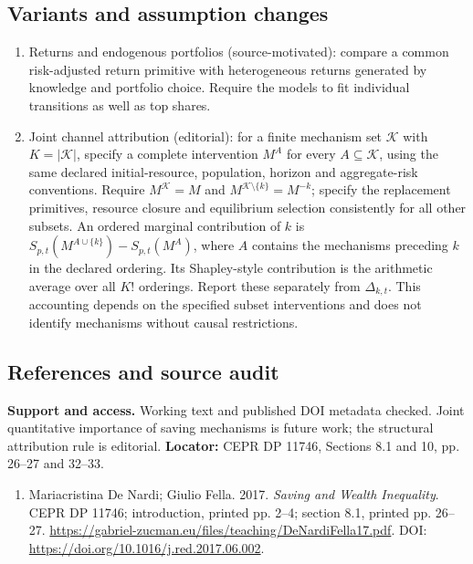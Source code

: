 \documentclass[11pt,a4paper]{article}
\begin{document}
\subsection*{Variants and assumption changes}
\begin{enumerate}
\item Returns and endogenous portfolios (source-motivated): compare a common risk-adjusted return primitive with heterogeneous returns generated by knowledge and portfolio choice. Require the models to fit individual transitions as well as top shares.
\item Joint channel attribution (editorial): for a finite mechanism set \(\mathcal K\) with \(K=|\mathcal K|\), specify a complete intervention \(M^A\) for every \(A\subseteq\mathcal K\), using the same declared initial-resource, population, horizon and aggregate-risk conventions. Require \(M^{\mathcal K}=M\) and \(M^{\mathcal K\setminus\{k\}}=M^{-k}\); specify the replacement primitives, resource closure and equilibrium selection consistently for all other subsets. An ordered marginal contribution of \(k\) is \(S_{p,t}(M^{A\cup\{k\}})-S_{p,t}(M^A)\), where \(A\) contains the mechanisms preceding \(k\) in the declared ordering. Its Shapley-style contribution is the arithmetic average over all \(K!\) orderings. Report these separately from \(\Delta_{k,t}\). This accounting depends on the specified subset interventions and does not identify mechanisms without causal restrictions.
\end{enumerate}
\subsection*{References and source audit}
\textbf{Support and access.} Working text and published DOI metadata checked. Joint quantitative importance of saving mechanisms is future work; the structural attribution rule is editorial. \textbf{Locator:} CEPR DP 11746, Sections 8.1 and 10, pp. 26--27 and 32--33.
\begin{enumerate}\raggedright
\item\hypertarget{definitions:source:30007644:1}{} Mariacristina De Nardi; Giulio Fella. 2017. \emph{Saving and Wealth Inequality}. CEPR DP 11746; introduction, printed pp. 2–4; section 8.1, printed pp. 26–27.
\url{https://gabriel-zucman.eu/files/teaching/DeNardiFella17.pdf}.
DOI: \url{https://doi.org/10.1016/j.red.2017.06.002}.
\end{enumerate}
\end{document}
